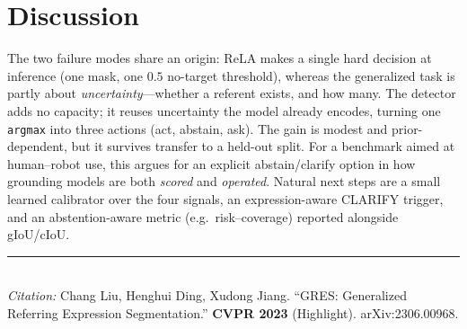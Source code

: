 \documentclass[11pt]{article}
\newcommand{\code}[1]{\texttt{\small #1}}
\begin{document}
\section{Discussion}
The two failure modes share an origin: ReLA makes a single hard decision at inference (one mask, one
$0.5$ no-target threshold), whereas the generalized task is partly about \emph{uncertainty}---whether
a referent exists, and how many. The detector adds no capacity; it reuses uncertainty the model
already encodes, turning one \code{argmax} into three actions (act, abstain, ask). The gain is modest
and prior-dependent, but it survives transfer to a held-out split. For a benchmark aimed at
human--robot use, this argues for an explicit abstain/clarify option in how grounding models are both
\emph{scored} and \emph{operated}. Natural next steps are a small learned calibrator over the four
signals, an expression-aware CLARIFY trigger, and an abstention-aware metric (e.g.\ risk--coverage)
reported alongside gIoU/cIoU.

\vspace{1ex}
\noindent\rule{\linewidth}{0.3pt}\\[0.4ex]
{\small\emph{Citation:} Chang Liu, Henghui Ding, Xudong Jiang. ``GRES: Generalized Referring
Expression Segmentation.'' \textbf{CVPR 2023} (Highlight). arXiv:2306.00968.}
\end{document}
